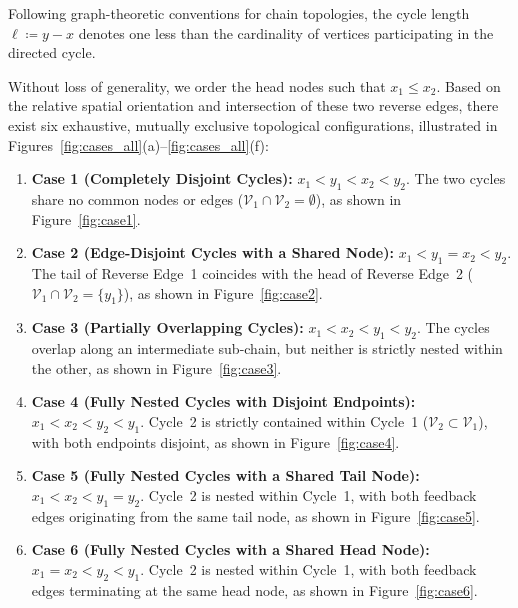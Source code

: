 \documentclass[openright,twoside]{iitbthesis}
\begin{document}
\begin{remark}\label{rem:ch_TRE_cyclelengthdef}
Following graph-theoretic conventions for chain topologies, the cycle length $\ell \coloneqq y - x$ denotes one less than the cardinality of vertices participating in the directed cycle.
\end{remark}

Without loss of generality, we order the head nodes such that $x_1 \le x_2$. Based on the relative spatial orientation and intersection of these two reverse edges, there exist six exhaustive, mutually exclusive topological configurations, illustrated in Figures~\ref{fig:cases_all}(a)--\ref{fig:cases_all}(f):

\begin{enumerate}
    \item \textbf{Case 1 (Completely Disjoint Cycles):} $x_1 < y_1 < x_2 < y_2$. The two cycles share no common nodes or edges ($\mathcal{V}_1 \cap \mathcal{V}_2 = \emptyset$), as shown in Figure~\ref{fig:case1}.
    \item \textbf{Case 2 (Edge-Disjoint Cycles with a Shared Node):} $x_1 < y_1 = x_2 < y_2$. The tail of Reverse Edge~1 coincides with the head of Reverse Edge~2 ($\mathcal{V}_1 \cap \mathcal{V}_2 = \{y_1\}$), as shown in Figure~\ref{fig:case2}.
    \item \textbf{Case 3 (Partially Overlapping Cycles):} $x_1 < x_2 < y_1 < y_2$. The cycles overlap along an intermediate sub-chain, but neither is strictly nested within the other, as shown in Figure~\ref{fig:case3}.
    \item \textbf{Case 4 (Fully Nested Cycles with Disjoint Endpoints):} $x_1 < x_2 < y_2 < y_1$. Cycle~2 is strictly contained within Cycle~1 ($\mathcal{V}_2 \subset \mathcal{V}_1$), with both endpoints disjoint, as shown in Figure~\ref{fig:case4}.
    \item \textbf{Case 5 (Fully Nested Cycles with a Shared Tail Node):} $x_1 < x_2 < y_1 = y_2$. Cycle~2 is nested within Cycle~1, with both feedback edges originating from the same tail node, as shown in Figure~\ref{fig:case5}.
    \item \textbf{Case 6 (Fully Nested Cycles with a Shared Head Node):} $x_1 = x_2 < y_2 < y_1$. Cycle~2 is nested within Cycle~1, with both feedback edges terminating at the same head node, as shown in Figure~\ref{fig:case6}.
\end{enumerate}
\end{document}
